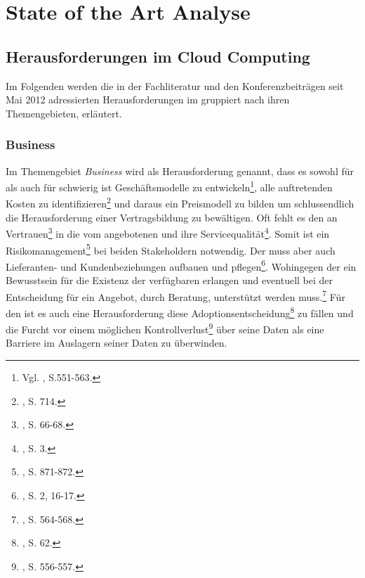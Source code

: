 
\section{State of the Art Analyse}
\label{sec:Analyse}

\subsection{Herausforderungen im Cloud Computing}
\label{sec:Herausforderungen}
Im Folgenden werden die in der Fachliteratur und den Konferenzbeiträgen seit Mai 2012 adressierten Herausforderungen im \TCCComma gruppiert nach ihren Themengebieten, erläutert.  

\subsubsection{Business}
Im Themengebiet \emph{Business} wird als Herausforderung genannt, dass es sowohl für \CSU als auch für \CSP schwierig ist Geschäftsmodelle zu entwickeln\footnote{Vgl. \cite{Chard.2012}, S.551-563.}, alle auftretenden Kosten zu identifizieren\footnote{\cite{Son.2012}, S. 714.}\saveFN{\Son} 
und daraus ein Preismodell zu bilden um schlussendlich die Herausforderung einer Vertragsbildung\useFN{\Son} 
zu bewältigen. Oft fehlt es den \CSUn an Vertrauen\footnote{\cite{Garrison.2012}, S. 66-68.} in die vom \CSP angebotenen \CSs und ihre Servicequalität\footnote{\cite{Knapper.2012}, S. 3.}. 
Somit ist ein Risikomanagement\footnote{\cite{Martens.2012}, S. 871-872.} bei beiden Stakeholdern notwendig.
\newline
Der \CSP muss aber auch Lieferanten- und Kundenbeziehungen aufbauen und pflegen\footnote{\cite{Giessmann.2012}, S. 2, 16-17.}. Wohingegen der \CSU ein Bewusstsein für die Existenz der verfügbaren \CSs erlangen und eventuell bei der Entscheidung für ein \CC Angebot, durch Beratung, unterstützt werden muss.\footnote{\cite{Sim.2012}, S. 564-568.}
\newline
Für den \CSU ist es auch eine Herausforderung diese Adoptionsentscheidung\footnote{\cite{Garrison.2012}, S. 62.} zu fällen und die Furcht vor einem möglichen Kontrollverlust\footnote{\cite{Sundareswaran.2012}, S. 556-557.} über seine Daten als eine Barriere im Auslagern seiner Daten zu überwinden.


